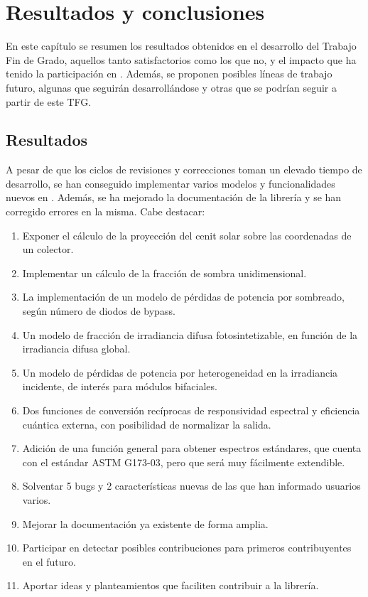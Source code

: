 \chapter{Resultados y conclusiones} \label{chp:resultados}

En este capítulo se resumen los resultados obtenidos en el desarrollo del Trabajo Fin de Grado, aquellos tanto satisfactorios como los que no, y el impacto que ha tenido la participación en \pvlibpy. Además, se proponen posibles líneas de trabajo futuro, algunas que seguirán desarrollándose y otras que se podrían seguir a partir de este TFG.


\section{Resultados} \label{sct:resultados_resultados}

A pesar de que los ciclos de revisiones y correcciones toman un elevado tiempo de desarrollo, se han conseguido implementar varios modelos y funcionalidades nuevos en \pvlibpy. Además, se ha mejorado la documentación de la librería y se han corregido errores en la misma. Cabe destacar:

\begin{enumerate}
    \item Exponer el cálculo de la proyección del \gls{cenit} solar sobre las coordenadas de un colector.
    \item Implementar un cálculo de la fracción de \gls{sombra} unidimensional.
    \item La implementación de un modelo de pérdidas de potencia por sombreado, según número de \gls{diodos de bypass}.
    \item Un modelo de fracción de irradiancia difusa fotosintetizable, en función de la irradiancia \gls{difusa} global.
    \item Un modelo de pérdidas de potencia por heterogeneidad en la irradiancia incidente, de interés para \gls{módulos bifaciales}.
    \item Dos funciones de conversión recíprocas de responsividad espectral y \gls{eficiencia cuántica externa}, con posibilidad de normalizar la salida.
    \item Adición de una función general para obtener espectros estándares, que cuenta con el \gls{estándar} ASTM G173-03, pero que será muy fácilmente extendible.
    \item Solventar 5 bugs y 2 características nuevas de las que han informado usuarios varios.
    \item Mejorar la documentación ya existente de forma amplia.
    \item Participar en detectar posibles contribuciones para primeros contribuyentes en el futuro.
    \item Aportar ideas y planteamientos que faciliten contribuir a la librería.
\end{enumerate}

